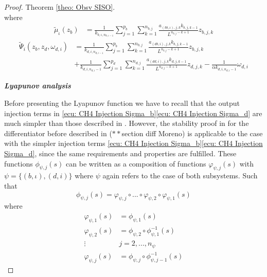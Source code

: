\documentclass[11pt,letterpaper,twoside,openright]{report}
\begin{document}
\begin{proof}{Theorem \ref{theo: Obsv SISO}. \\}
where
\begin{equation}
	\begin{split}\label{ecu: CH4 mu_tilde}
		\tilde{\mu}_{\iota}(z_b) &= \frac{1}{k_{b,\iota,n_{b,\iota-1}}}\sum_{j=1}^{p_b}\sum_{k=1}^{n_{b,j}} \frac{a_{(bb,\iota),j,k}k_{b,j,k-1}}{L^{n_{b,j}-k+1}}z_{b,j,k} 
	\end{split} 
\end{equation}
\begin{equation}
	\begin{split}\label{ecu: CH4 Psi_tilde}
		\tilde{\Psi}_{i}(z_b,z_d,\omega_{d,i})&=\frac{1}{k_{d,i,n_{d,i-1}}}\sum_{j=1}^{p_b}\sum_{k=1}^{n_{b,j}}  \frac{a_{(db,i),j,k}k_{b,j,k-1}}{L^{n_{b,j}-k+1}} z_{b,j,k} \\
		&+ \frac{1}{k_{d,i,n_{d,i}-1}} \sum_{j=1}^{p_d}\sum_{k=1}^{n_{d,j}}  \frac{a_{(dd,i),j,k}k_{d,j,k-1}}{L^{n_{d,j}-k+1}} z_{d,j,k} - \frac{1}{\alpha k_{d,i,n_{d,i}-1}}\omega_{d,i}
	\end{split} 
\end{equation}


	\textbf{\textit{Lyapunov analysis}}
	
	Before presenting the Lyapunov function we have to recall that the output injection terms in \eqref{ecu: CH4 Injection Sigma_b}\eqref{ecu: CH4 Injection Sigma_d} are much simpler than those described in \cite{Moreno2021}. However, the stability proof in \cite{Moreno2021} for the differentiator before described in ($**$section diff Moreno) is applicable to the case with the simpler injection terms \eqref{ecu: CH4 Injection Sigma_b}\eqref{ecu: CH4 Injection Sigma_d}, since the same requirements and properties are fulfilled. These functions $\phi_{\psi,j}(s)$ can be written as a composition of functions $\varphi_{\psi,j}(s)$ with $\psi=\{(b,\iota),(d,i)\}$ where $\psi$ again refers to the case of both subsystems. Such that
	\begin{equation}\label{ecu: CH4 phi_comp}
		\phi_{\psi,j}(s) = \varphi_{\psi,j} \circ ... \circ \varphi_{\psi,2} \circ \varphi_{\psi,1}(s)
	\end{equation}
	where
	\begin{equation}
		\begin{split}
			\varphi_{\psi,1}(s) &= \phi_{\psi,1}(s) \\
			\varphi_{\psi,2}(s) &= \phi_{\psi,2} \circ \phi_{\psi,1}^{-1}(s) \\
			\vdots \quad & j=2,...,n_{\psi}\\
			\varphi_{\psi,j}(s) &= \phi_{\psi,j}\circ\phi^{-1}_{\psi,j-1}(s)
		\end{split}
	\end{equation}


\end{proof}
\end{document}
